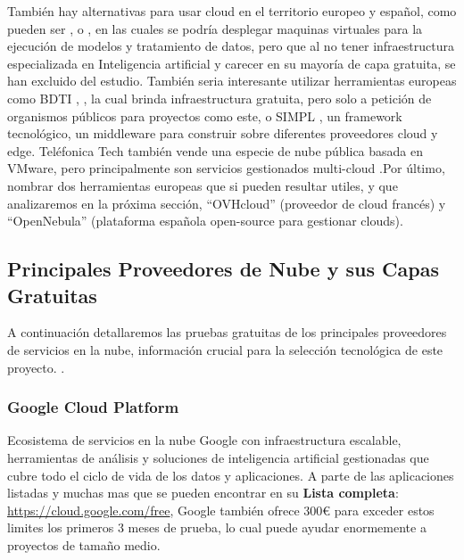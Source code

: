 También hay alternativas para usar cloud en el territorio europeo y español, como pueden ser \citep{cloudingIO}, \citep{nextcloudCloud} o \citep{gigasCloud}, en las cuales se podría desplegar maquinas virtuales para la ejecución de modelos y tratamiento de datos, pero que al no tener infraestructura especializada en Inteligencia artificial y carecer en su mayoría de capa gratuita, se han excluido del estudio. También seria interesante utilizar herramientas europeas como BDTI \citep{BDTIEuropeProject}, \citep{GobEspana2021BDTI}, la cual brinda infraestructura gratuita, pero solo a petición de organismos públicos para proyectos como este, o SIMPL \citep{SIMPLEuropeProject}, un framework tecnológico, un middleware para construir sobre diferentes proveedores cloud y edge. Teléfonica Tech también vende una especie de nube pública basada en VMware, pero principalmente son servicios gestionados multi-cloud \citep{TelefonicaTechCloudPlatform}.Por último, nombrar dos herramientas europeas que si pueden resultar utiles, y que analizaremos en la próxima sección, ``OVHcloud'' (proveedor de cloud francés) y ``OpenNebula'' (plataforma española open-source para gestionar clouds). \\

\subsection{Principales Proveedores de Nube y sus Capas Gratuitas}
\label{sec:cloud-free-tiers}

A continuación detallaremos las pruebas gratuitas de los principales proveedores de servicios en la nube, información crucial para la selección tecnológica de este proyecto. \citep{free-for-dev}.

\subsubsection*{Google Cloud Platform}

Ecosistema de servicios en la nube Google con infraestructura escalable, herramientas de análisis y soluciones de inteligencia artificial gestionadas que cubre todo el ciclo de vida de los datos y aplicaciones. A parte de las aplicaciones listadas y muchas mas que se pueden encontrar en su \textbf{Lista completa}: \url{https://cloud.google.com/free}, Google también ofrece 300€ para exceder estos limites los primeros 3 meses de prueba, lo cual puede ayudar enormemente a proyectos de tamaño medio.

